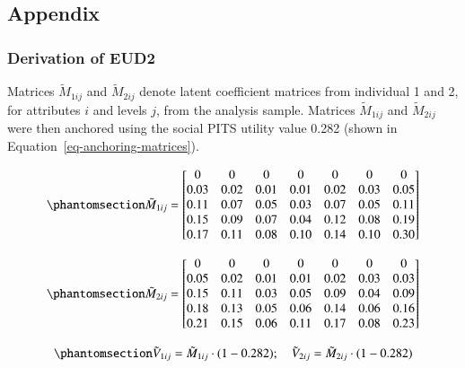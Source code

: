 \documentclass[
  number,
  preprint]{elsarticle}
\begin{document}
\begin{longtable}[]{@{}llll@{}}
\end{longtable}

\subsection{Appendix}\label{appendix}

\subsubsection{Derivation of EUD2}\label{sec-appendix1}

Matrices \(\tilde{M}_{1ij}\) and \(\tilde{M}_{2ij}\) denote latent
coefficient matrices from individual 1 and 2, for attributes \(i\) and
levels \(j\), from the analysis sample. Matrices \(\tilde{M}_{1ij}\) and
\(\tilde{M}_{2ij}\) were then anchored using the social PITS utility
value 0.282 (shown in Equation~\ref{eq-anchoring-matrices}).

\begin{equation}\phantomsection\label{eq-coef-1}{
\tilde{M}_{1ij} =  
\begin{bmatrix}
0 & 0 & 0 & 0 & 0 & 0 & 0 \\
0.03 & 0.02 & 0.01 & 0.01 & 0.02 & 0.03 & 0.05 \\
0.11 & 0.07 & 0.05 & 0.03 & 0.07 & 0.05 & 0.11 \\
0.15 & 0.09 & 0.07 & 0.04 & 0.12 & 0.08 & 0.19 \\
0.17 & 0.11 & 0.08 & 0.10 & 0.14 & 0.10 & 0.30
\end{bmatrix}
}\end{equation}

\begin{equation}\phantomsection\label{eq-coef-2}{
\tilde{M}_{2ij} =  
\begin{bmatrix}
0 & 0 & 0 & 0 & 0 & 0 & 0 \\
0.05 & 0.02 & 0.01 & 0.01 & 0.02 & 0.03 & 0.03 \\
0.15 & 0.11 & 0.03 & 0.05 & 0.09 & 0.04 & 0.09 \\
0.18 & 0.13 & 0.05 & 0.06 & 0.14 & 0.06 & 0.16 \\
0.21 & 0.15 & 0.06 & 0.11 & 0.17 & 0.08 & 0.23
\end{bmatrix}
}\end{equation}

\begin{equation}\phantomsection\label{eq-anchoring-matrices}{
    \tilde{V}_{1ij} = \tilde{M}_{1ij} \cdot (1-0.282); \quad
    \tilde{V}_{2ij} = \tilde{M}_{2ij} \cdot (1-0.282)
}\end{equation}
\end{document}
